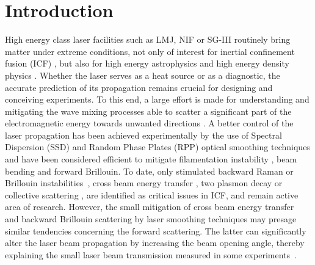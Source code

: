 \documentclass[
 reprint,
 superscriptaddress,
 amsmath,amssymb,
 aps,
]{revtex4-1}
\begin{document}
\section{Introduction}
High energy class laser facilities such as LMJ,  NIF or SG-III routinely bring matter under extreme conditions, not only of interest for inertial confinement fusion (ICF) \cite{Cavailler_2005,Lindl_2004,MRE_Zheng_2017}, but also for high energy astrophysics  and high energy density physics   \cite{Drake2006}. 
Whether the laser serves as a heat source or as a diagnostic, the accurate prediction of its propagation remains crucial for designing and  conceiving experiments. 
To this end, a large effort is made for understanding and mitigating the wave mixing processes able to scatter a significant part of the electromagnetic energy towards unwanted directions \cite[]{Shen_1965,Forslund_1973}. A better control of the laser propagation has been achieved experimentally by the use of Spectral Dispersion (SSD) and  Random Phase Plates (RPP) optical smoothing techniques\cite[]{Kato_1984,Skupski_1989,NatPhys_Glenzer,NatPhys_Labaune} and have been considered efficient to mitigate filamentation instability \cite[]{phd_Michel,POP_Michel_2003,Lushnikov_2006,PRL_Sarri_2011}, beam bending\cite[]{PRL_Hinkel_1996,
POP_Bezzerides_1998,PRL_Young_1998,POP_Ruyer_2020} and forward Brillouin.
To date, only stimulated backward Raman or Brillouin instabilities~\cite{POP_Liu_2009,hao_2013},  cross beam energy transfer \cite{hao_2016}, two plasmon decay \cite[]{Dubois_1995,Russell_2001} or collective scattering  \cite[]{PRL_Neuville_2016,PRL_Depierreux_2016}, are identified as critical issues in ICF, and remain active area of research. However, the small mitigation of cross beam energy transfer~\cite{PRL_Neuville_2016cbet} and backward Brillouin scattering by laser smoothing techniques may presage similar tendencies concerning the forward scattering. %
The latter can significantly alter the laser beam propagation by increasing the beam opening angle, thereby explaining the small laser beam transmission measured in some experiments~\cite{POP_Rousseaux_2015}.
 
\end{document}
